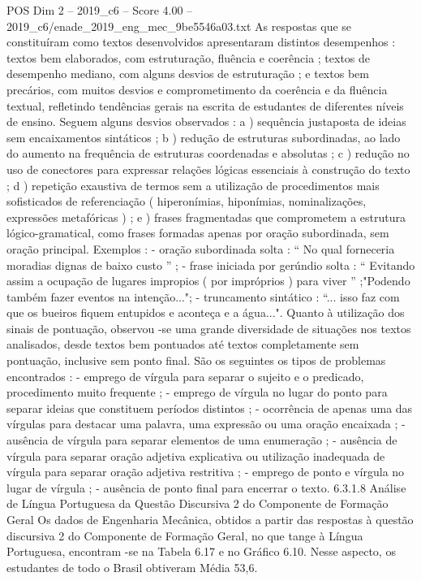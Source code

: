 \begin{textsample}{POS Dim 2 – 2019\_c6 – Score 4.00 – 2019\_c6/enade\_2019\_eng\_mec\_9be5546a03.txt}
As respostas que se constituíram como textos desenvolvidos apresentaram distintos desempenhos : textos bem elaborados, com estruturação, fluência e coerência ; textos de desempenho mediano, com alguns desvios de estruturação ; e textos bem precários, com muitos desvios e comprometimento da coerência e da fluência textual, refletindo tendências gerais na escrita de estudantes de diferentes níveis de ensino.
Seguem alguns desvios observados : a ) sequência justaposta de ideias sem encaixamentos sintáticos ; b ) redução de estruturas subordinadas, ao lado do aumento na frequência de estruturas coordenadas e absolutas ; c ) redução no uso de conectores para expressar relações lógicas essenciais à construção do texto ; d ) repetição exaustiva de termos sem a utilização de procedimentos mais sofisticados de referenciação ( hiperonímias, hiponímias, nominalizações, expressões metafóricas ) ; e ) frases fragmentadas que comprometem a estrutura lógico-gramatical, como frases formadas apenas por oração subordinada, sem oração principal.
Exemplos : - oração subordinada solta : “ No qual forneceria moradias dignas de baixo custo ” ; - frase iniciada por gerúndio solta : “ Evitando assim a ocupação de lugares impropios ( por impróprios ) para viver ” ;"Podendo também fazer eventos na intenção..."; - truncamento sintático : “... isso faz com que os bueiros fiquem entupidos e aconteça e a água...".
Quanto à utilização dos sinais de pontuação, observou -se uma grande diversidade de situações nos textos analisados, desde textos bem pontuados até textos completamente sem pontuação, inclusive sem ponto final.
São os seguintes os tipos de problemas encontrados : - emprego de vírgula para separar o sujeito e o predicado, procedimento muito frequente ; - emprego de vírgula no lugar do ponto para separar ideias que constituem períodos distintos ; - ocorrência de apenas uma das vírgulas para destacar uma palavra, uma expressão ou uma oração encaixada ; - ausência de vírgula para separar elementos de uma enumeração ; - ausência de vírgula para separar oração adjetiva explicativa ou utilização inadequada de vírgula para separar oração adjetiva restritiva ; - emprego de ponto e vírgula no lugar de vírgula ; - ausência de ponto final para encerrar o texto. 6.3.1.8 Análise de Língua Portuguesa da Questão Discursiva 2 do Componente de Formação Geral Os dados de Engenharia Mecânica, obtidos a partir das respostas à questão discursiva 2 do Componente de Formação Geral, no que tange à Língua Portuguesa, encontram -se na Tabela 6.17 e no Gráfico 6.10.
Nesse aspecto, os estudantes de todo o Brasil obtiveram Média 53,6.

\end{textsample}
